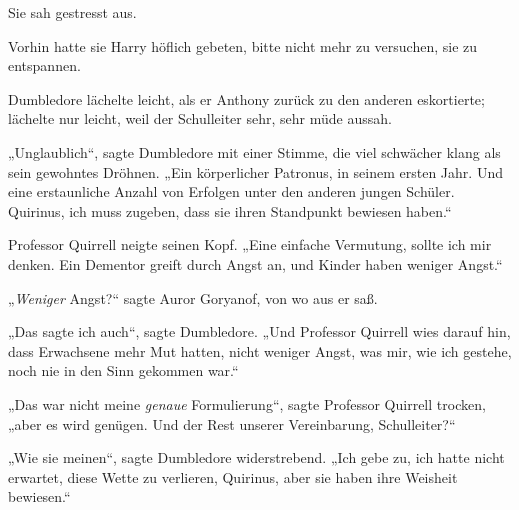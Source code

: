 Sie sah gestresst aus.

Vorhin hatte sie Harry höflich gebeten, bitte nicht mehr zu versuchen, sie zu entspannen.

Dumbledore lächelte leicht, als er Anthony zurück zu den anderen eskortierte; lächelte nur leicht, weil der Schulleiter sehr, sehr müde aussah.

„Unglaublich“, sagte Dumbledore mit einer Stimme, die viel schwächer klang als sein gewohntes Dröhnen.
„Ein körperlicher Patronus, in seinem ersten Jahr. Und eine erstaunliche Anzahl von Erfolgen unter den anderen jungen Schüler. Quirinus, ich muss zugeben, dass sie ihren Standpunkt bewiesen haben.“

Professor Quirrell neigte seinen Kopf.
„Eine einfache Vermutung, sollte ich mir denken. Ein Dementor greift durch Angst an, und Kinder haben weniger Angst.“

„\emph{Weniger} Angst?“ sagte Auror Goryanof, von wo aus er saß.

„Das sagte ich auch“, sagte Dumbledore.
„Und Professor Quirrell wies darauf hin, dass Erwachsene mehr Mut hatten, nicht weniger Angst, was mir, wie ich gestehe, noch nie in den Sinn gekommen war.“

„Das war nicht meine \emph{genaue} Formulierung“, sagte Professor Quirrell trocken, „aber es wird genügen. Und der Rest unserer Vereinbarung, Schulleiter?“

„Wie sie meinen“, sagte Dumbledore widerstrebend.
„Ich gebe zu, ich hatte nicht erwartet, diese Wette zu verlieren, Quirinus, aber sie haben ihre Weisheit bewiesen.“

